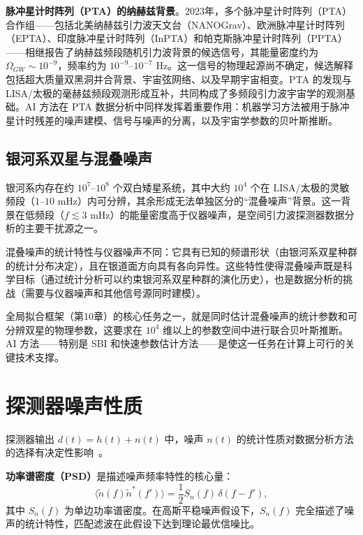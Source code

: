 \textbf{脉冲星计时阵列（PTA）的纳赫兹背景}。2023年，多个脉冲星计时阵列（PTA）合作组——包括北美纳赫兹引力波天文台（NANOGrav）、欧洲脉冲星计时阵列（EPTA）、印度脉冲星计时阵列（InPTA）和帕克斯脉冲星计时阵列（PPTA）——相继报告了纳赫兹频段随机引力波背景的候选信号，其能量密度约为 $\Omega_{GW} \sim 10^{-9}$，频率约为 $10^{-9}$--$10^{-7}$ Hz。这一信号的物理起源尚不确定，候选解释包括超大质量双黑洞并合背景、宇宙弦网络、以及早期宇宙相变。PTA 的发现与 LISA/太极的毫赫兹频段观测形成互补，共同构成了多频段引力波宇宙学的观测基础。AI 方法在 PTA 数据分析中同样发挥着重要作用：机器学习方法被用于脉冲星计时残差的噪声建模、信号与噪声的分离，以及宇宙学参数的贝叶斯推断。

\subsection{银河系双星与混叠噪声}

银河系内存在约 $10^7$--$10^8$ 个双白矮星系统，其中大约 $10^4$ 个在 LISA/太极的灵敏频段（$1$--$10$ mHz）内可分辨，其余形成无法单独区分的“混叠噪声”背景。这一背景在低频段（$f \lesssim 3$ mHz）的能量密度高于仪器噪声，是空间引力波探测器数据分析的主要干扰源之一。

混叠噪声的统计特性与仪器噪声不同：它具有已知的频谱形状（由银河系双星种群的统计分布决定），且在银道面方向具有各向异性。这些特性使得混叠噪声既是科学目标（通过统计分析可以约束银河系双星种群的演化历史），也是数据分析的挑战（需要与仪器噪声和其他信号源同时建模）。

全局拟合框架（第10章）的核心任务之一，就是同时估计混叠噪声的统计参数和可分辨双星的物理参数，这要求在 $10^4$ 维以上的参数空间中进行联合贝叶斯推断。AI 方法——特别是 SBI 和快速参数估计方法——是使这一任务在计算上可行的关键技术支撑。

\section{探测器噪声性质}

探测器输出 $d(t) = h(t) + n(t)$ 中，噪声 $n(t)$ 的统计性质对数据分析方法的选择有决定性影响~\cite{Christensen2022noise}。

\textbf{功率谱密度（PSD）}是描述噪声频率特性的核心量：
\begin{equation}
  \langle\tilde{n}(f)\tilde{n}^*(f')\rangle = \frac{1}{2}S_n(f)\,\delta(f - f'),
\end{equation}
其中 $S_n(f)$ 为单边功率谱密度。在高斯平稳噪声假设下，$S_n(f)$ 完全描述了噪声的统计特性，匹配滤波在此假设下达到理论最优信噪比。


